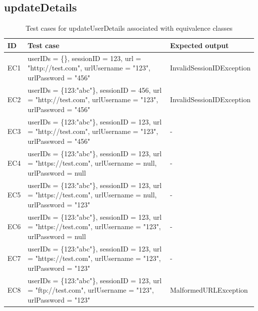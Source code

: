 \documentclass{article}
\begin{document}
\subsection{updateDetails}
\begin{longtable}{|p{2cm}|p{7cm}|p{5cm}|}
\caption{Test cases for updateUserDetails associated with equivalence classes}\\
\hline 
ID&Test case&Expected output\\
\hline  
EC1&userIDs = \{\}, sessionID = 123, url = "http://test.com", urlUsername = "123", urlPassword = "456"&InvalidSessionIDException\\
\hline
EC2&userIDs = \{123:"abc"\}, sessionID = 456, url = "http://test.com", urlUsername = "123", urlPassword = "456"&InvalidSessionIDException\\
\hline
EC3&userIDs = \{123:"abc"\}, sessionID = 123, url = "http://test.com", urlUsername = "123", urlPassword = "456"&-\\
\hline
EC4&userIDs = \{123:"abc"\}, sessionID = 123, url = "https://test.com", urlUsername = null, urlPassword = null&-\\
\hline
EC5&userIDs = \{123:"abc"\}, sessionID = 123, url = "https://test.com", urlUsername = null, urlPassword = "123"&-\\
\hline
EC6&userIDs = \{123:"abc"\}, sessionID = 123, url = "https://test.com", urlUsername = "123", urlPassword = null&-\\
\hline
EC7&userIDs = \{123:"abc"\}, sessionID = 123, url = "https://test.com", urlUsername = "123", urlPassword = "123"&-\\
\hline
EC8&userIDs = \{123:"abc"\}, sessionID = 123, url = "ftp://test.com", urlUsername = "123", urlPassword = "123"&MalformedURLException\\
\hline
\end{longtable}

\end{document}
